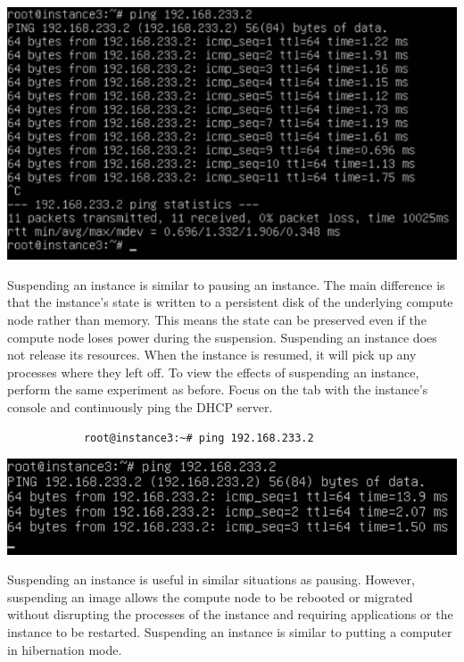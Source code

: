 \documentclass[letterpaper, 12pt]{article}
\begin{document}
\begin{enumerate}
\begin{labstep}
        \begin{center}
            \includegraphics[width=\linewidth]{images/part3/step11.png}
        \end{center}
    \end{labstep}

    \begin{labstep}
        Suspending an instance is similar to pausing an instance.
        The main difference is that the instance's state is written to a persistent disk of the underlying compute node rather than memory.
        This means the state can be preserved even if the compute node loses power during the suspension.
        Suspending an instance does not release its resources.
        When the instance is resumed, it will pick up any processes where they left off.
        To view the effects of suspending an instance, perform the same experiment as before.
        Focus on the tab with the instance's console and continuously ping the DHCP server.
        \begin{lstlisting}
            root@instance3:~# ping 192.168.233.2
        \end{lstlisting}

        \begin{center}
            \includegraphics[width=\linewidth]{images/part3/step12.png}
        \end{center}
    \end{labstep}

    \begin{tipbox}
        Suspending an instance is useful in similar situations as pausing.
        However, suspending an image allows the compute node to be rebooted or migrated without disrupting the processes of the instance and requiring applications or the instance to be restarted.
        Suspending an instance is similar to putting a computer in hibernation mode.
    \end{tipbox}


\end{enumerate}
\end{document}
